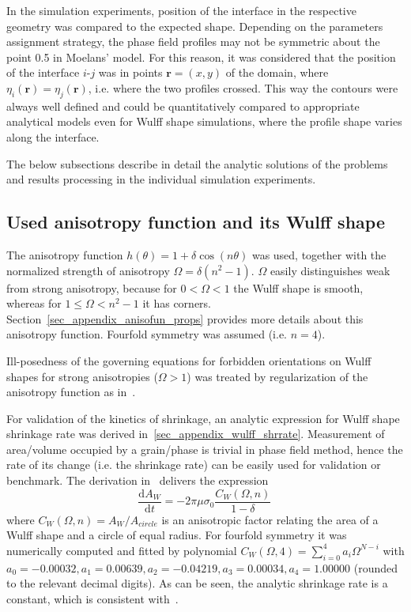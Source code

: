In the simulation experiments, position of the interface in the respective geometry was compared to the expected shape. Depending on the parameters assignment strategy, the phase field profiles may not be symmetric about the point 0.5 in Moelans' model. For this reason, it was considered that the position of the interface $i$-$j$ was in points $\bm{r}=(x,y)$ of the domain, where $\eta_i(\bm{r})=\eta_j(\bm{r})$, i.e. where the two profiles crossed. This way the contours were always well defined and could be quantitatively compared to appropriate analytical models even for Wulff shape simulations, where the profile shape varies along the interface.

The below subsections describe in detail the analytic solutions of the problems and results processing in the individual simulation experiments. 

\subsection{Used anisotropy function and its Wulff shape}
The anisotropy function $h(\theta)=1+\delta\cos(n\theta)$ was used, together with the normalized strength of anisotropy $\Omega=\delta(n^2-1)$. $\Omega$ easily distinguishes weak from strong anisotropy, because for $0<\Omega<1$ the Wulff shape is smooth, whereas for $1\leq\Omega<n^2-1$ it has corners. Section~\ref{sec_appendix_anisofun_props} provides more details about this anisotropy function. Fourfold symmetry was assumed (i.e. $n=4$).

Ill-posedness of the governing equations for forbidden orientations on Wulff shapes for strong anisotropies ($\Omega>1$) was treated by regularization of the anisotropy function as in~\cite{Eggleston2001}.

For validation of the kinetics of shrinkage, an analytic expression for Wulff shape shrinkage rate was derived in~\ref{sec_appendix_wulff_shrrate}. Measurement of area/volume occupied by a grain/phase is trivial in phase field method, hence the rate of its change (i.e. the shrinkage rate) can be easily used for validation or benchmark. The derivation in~\cite{Minar2021suppl} delivers the expression
\begin{equation}\label{eq_wulff_shrrate}
	\frac{\mathrm{d}A_W}{\mathrm{d}t} = -2\pi\mu\sigma_0  \frac{C_W(\Omega,n)}{1-\delta} \,
\end{equation}
where $C_W(\Omega,n)=A_W/A_{circle}$ is an anisotropic factor relating the area of a Wulff shape and a circle of equal radius. For fourfold symmetry it was numerically computed and fitted by polynomial $C_W(\Omega,4)= \sum_{i=0}^4a_i\Omega^{N-i}$ with $a_0=-0.00032 ,a_1=0.00639 ,a_2=-0.04219 , a_3=0.00034 , a_4=1.00000$ (rounded to the relevant decimal digits). As can be seen, the analytic shrinkage rate is a constant, which is consistent with~\cite{Taylor1998}.


